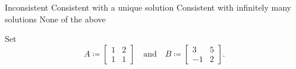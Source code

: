 \begin{questions}
\begin{choices}
    \choice Inconsistent
    \choice Consistent with a unique solution
    \choice Consistent with infinitely many solutions
    \choice None of the above
  \end{choices}
  \newpage
  \question Set
  \[
    A\coloneq
    \begin{bmatrix}
      1&2\\1&1
    \end{bmatrix}
    \quad\text{and}\quad
    B\coloneq
    \begin{bmatrix}
      3&5\\
      -1&2
    \end{bmatrix}.
  \]
  \\
\end{questions}


